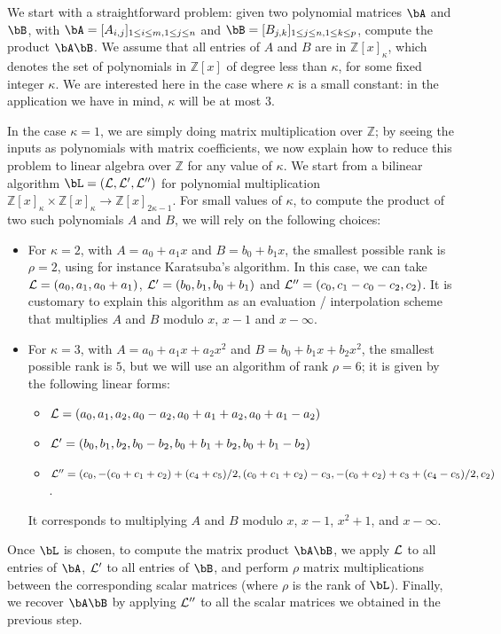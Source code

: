 \documentclass[acmtoms]{acmsmall}
\def\Z{\mathbb{Z}}
\begin{document}
\medskip

We start with a straightforward problem: given two polynomial matrices
$\bA$ and $\bB$, with $\bA=[A_{i,j}]_{1 \le i \le m, 1 \le j \le n}$
and $\bB=[B_{j,k}]_{1 \le j \le n, 1 \le k \le p}$, compute the
product $\bA \bB$. We assume that all entries of $A$ and $B$ are in
$\Z[x]_\kappa$, which denotes the set of polynomials in $\Z[x]$ of
degree less than $\kappa$, for some fixed integer $\kappa$. We are
interested here in the case where $\kappa$ is a small constant: in the
application we have in mind, $\kappa$ will be at most $3$.

In the case $\kappa=1$, we are simply doing matrix multiplication over
$\Z$; by seeing the inputs as polynomials with matrix coefficients, we
now explain how to reduce this problem to linear algebra over $\Z$ for
any value of $\kappa$. We start from a bilinear algorithm $\bL=({\cal
  L},{\cal L}',{\cal L}'')$ for polynomial multiplication
$\Z[x]_\kappa \times \Z[x]_\kappa \to \Z[x]_{2\kappa-1}$. For small
values of $\kappa$, to compute the product of two such polynomials $A$
and $B$, we will rely on the following choices:
\begin{itemize}
\item For $\kappa=2$, with $A=a_0+a_1 x$ and $B=b_0+b_1 x$, the
  smallest possible rank is $\rho=2$, using for instance Karatsuba's
  algorithm.  In this case, we can take ${\cal L}=(a_0, a_1,
  a_0+a_1)$, ${\cal L}'=(b_0, b_1, b_0+b_1)$ and ${\cal L}''=(c_0,
  c_1-c_0-c_2, c_2)$. It is customary to explain this algorithm as an
  evaluation / interpolation scheme that multiplies $A$ and $B$ modulo
  $x$, $x-1$ and $x-\infty$.
\item For $\kappa=3$, with $A=a_0+a_1 x+a_2 x^2$ and $B=b_0+b_1 x+b_2
  x^2$, the smallest possible rank is $5$, but we will use an
  algorithm of rank $\rho=6$; it is given by the following linear forms:
  \begin{itemize}
  \item ${\cal L}=(a_0,a_1,a_2,a_0-a_2,a_0+a_1+a_2,a_0+a_1-a_2)$
  \item ${\cal L}'=(b_0,b_1,b_2,b_0-b_2,b_0+b_1+b_2,b_0+b_1-b_2)$
  \item ${\cal L}''=(c_0, -(c_0 + c_1 + c_2) + (c_4 + c_5)/2, (c_0 + c_1
    + c_2) - c_3, -(c_0 + c_2) + c_3 + (c_4 -c_5)/2, c_2)$.
  \end{itemize}
  It corresponds to multiplying $A$ and $B$ modulo $x$, $x-1$, $x^2+1$,
  and $x-\infty$.
\end{itemize}
Once $\bL$ is chosen, to compute the matrix product $\bA\bB$, we apply
${\cal L}$ to all entries of $\bA$, ${\cal L}'$ to all entries of
$\bB$, and perform $\rho$ matrix multiplications between the
corresponding scalar matrices (where $\rho$ is the rank of
$\bL$). Finally, we recover $\bA \bB$ by applying ${\cal L}''$ to all
the scalar matrices we obtained in the previous step.  
\end{document}
